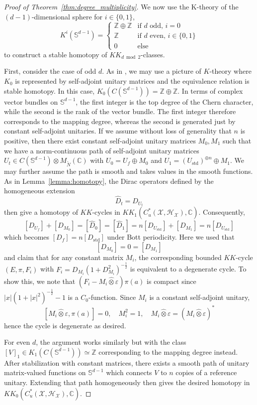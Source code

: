 \documentclass[12pt]{amsart}
\newcommand{\CM}{{\mathbb C}}
\newcommand{\SM}{{\mathbb S}}
\newcommand{\ZM}{{\mathbb Z}}
\newcommand{\Hh}{{\mathcal H}}
\newcommand{\Xx}{{\mathcal X}}
\newcommand{\ep}{\varepsilon}
\begin{document}
\begin{proof}[Proof of Theorem~\ref{thm:degree_multiplicity}]
We now use the K-theory of the $(d-1)$-dimensional sphere for $i \in \{0,1\}$,
$$K^i(\SM^{d-1}) =\begin{cases}
    \ZM \oplus \ZM & \text{if }d \text{ odd, }i=0 \\
    \ZM  & \text{if }d \text{ even, }i \in \{0,1\} \\
    0 & \text{else}
\end{cases}$$
to construct a stable homotopy of $KK_{d\bmod 2}$-classes. 

First, consider the case of odd $d$. As in \cite{SchulzBaldesStoiber2023}, we may use a picture of $K$-theory where $K_0$ is represented by self-adjoint unitary matrices and the equivalence relation is stable homotopy. 
In this case, $K_0(C(\SM^{d-1}))=\ZM\oplus \ZM$.
In terms of complex vector bundles on $\SM^{d-1}$, the first integer is the top degree of the Chern character, while the second is the rank of the vector bundle. 
The first integer therefore corresponds to the mapping degree, whereas the second is generated just by constant self-adjoint unitaries. If we assume without loss of generality that $n$ is positive, then there exist constant self-adjoint unitary matrices $M_0, M_1$ such that we have a norm-continuous path of self-adjoint unitary matrices $U_t \in C(\SM^{d-1})\otimes M_{\tilde{N}}(\CM)$ with $U_0=U_f \oplus M_0$ and $U_1= (U_{\mathrm{std}})^{\oplus n}\oplus M_1$. 
We may further assume the path is smooth and takes values in the smooth functions. As in Lemma~\ref{lemma:homotopy}, the Dirac operators defined by the homogeneous extension $$\hat{D}_t = D_{U_t}$$ then give a homotopy of $KK$-cycles in $KK_1(C^*_u(\Xx, \Hh_\Xx), \CM)$. 
Consequently,
$$[D_{U_f}]+[D_{M_0}]= [\hat{D}_0] = [\hat{D}_1] = n [D_{U_\mathrm{std}}]+ [D_{M_1}] = n[D_{U_\mathrm{std}}]$$
which becomes $[D_f]=n [D_{\mathrm{std}}]$ under Bott periodicity.
Here we used that
$$[D_{M_0}]=0=[D_{M_1}]$$
and claim that for any constant matrix $M_i$, the corresponding bounded $KK$-cycle $(E,\pi, F_i)$ with $F_i=D_{M_i}(1+D^2_{M_i})^{-\frac12}$ is equivalent to a degenerate cycle.
To show this, we note that $(F_{i}-{M_i}\hat{\otimes}\ep)\pi(a)$ is compact since $|x|(1+|x|^2)^{-\frac12}-1$ is a $C_0$-function. Since $M_i$ is a constant self-adjoint unitary,
\[[M_i \hat{\otimes}\ep,\pi(a)]=0, \quad M_i^2 = 1, \quad M_i \hat{\otimes}\ep = (M_i \hat{\otimes}\ep)^*\]
hence the cycle is degenerate as desired.


For even $d$, the argument works similarly but with the class $[V]_1\in K_1(C(\SM^{d-1}))\simeq \ZM$ corresponding to the mapping degree instead. 
After stabilization with constant matrices, there exists a smooth path of unitary matrix-valued functions on $\SM^{d-1}$ which connects $V$ to $n$ copies of a reference unitary. Extending that path homogeneously then gives the desired homotopy in $KK_0(C^*_u(\Xx, \Hh_\Xx), \CM)$.
\end{proof}
\end{document}
